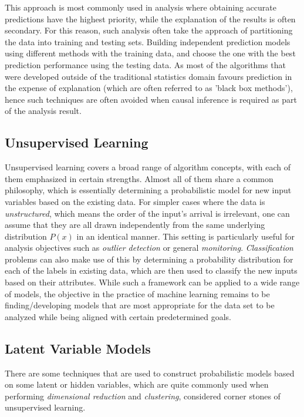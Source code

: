 \documentclass[letterpaper, 10 pt, conference]{ieeeconf}  %
\begin{document}
This approach is most commonly used in analysis where obtaining accurate predictions have the highest priority, while the explanation of the results is often secondary. For this reason, such analysis often take the approach of partitioning the data into training and testing sets. Building independent prediction models using different methods with the training data, and choose the one with the best prediction performance using the testing data. As most of the algorithms that were developed outside of the traditional statistics domain favours prediction in the expense of explanation (which are often referred to as 'black box methods'), hence such techniques are often avoided when causal inference is required as part of the analysis result.

\subsection{Unsupervised Learning}

Unsupervised learning \cite{Gentleman2008} covers a broad range of algorithm concepts, with each of them emphasized in certain strengths. Almost all of them share a common philosophy, which is essentially determining a probabilistic model for new input variables based on the existing data. For simpler cases where the data is \textit{unstructured}, which means the order of the input's arrival is irrelevant, one can assume that they are all drawn independently from the same underlying distribution $P(x)$ in an identical manner. This setting is particularly useful for analysis objectives such as \textit{outlier detection} or general \textit{monitoring}. \textit{Classification} problems can also make use of this by determining a probability distribution for each of the labels in existing data, which are then used to classify the new inputs based on their attributes. While such a framework can be applied to a wide range of models, the objective in the practice of machine learning remains to be finding/developing models that are most appropriate for the data set to be analyzed while being aligned with certain predetermined goals. 

\subsection*{Latent Variable Models}

There are some techniques that are used to construct probabilistic models based on some latent or hidden variables, which are quite commonly used when performing \textit{dimensional reduction} and \textit{clustering}, considered corner stones of unsupervised learning.
\end{document}
